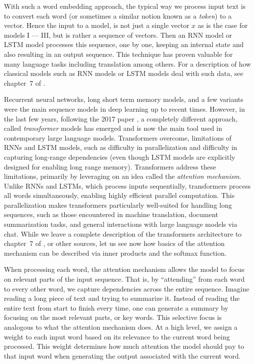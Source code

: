 \documentclass[12pt]{article}
\begin{document}
With such a word embedding approach, the typical way we process input text is to convert each word (or sometimes a similar notion known as a {\em token}) to a vector. Hence the input to a model, is not just a single vector $x$ as is the case for models I --- III, but is rather a sequence of vectors. Then an RNN model or LSTM model processes this sequence, one by one, keeping an internal state and also resulting in an output sequence. This technique has proven valuable for many language tasks including translation among others. For a description of how classical models such as RNN models or LSTM models deal with such data,  see chapter~7 of \cite{LiquetMokaNazarathy2024DeepLearning}.

Recurrent neural networks, long short term memory models, and a few variants were the main sequence models in deep learning up to recent times. However, in the last few years, following the 2017 paper \cite{vaswani2017attention}, a completely different approach, called {\em transformer} models has emerged and is now the main tool used in contemporary large language models. Transformers overcome, limitations of RNNs and LSTM models, such as difficulty in parallelization and difficulty in capturing long-range dependencies (even though LSTM models are explicitly designed for enabling long range memory). Transformers address these limitations, primarily by leveraging on an idea called the {\em attention mechanism}. Unlike RNNs and LSTMs, which process inputs sequentially, transformers process all words simultaneously, enabling highly efficient parallel computation. This parallelization makes transformers particularly well-suited for handling long sequences, such as those encountered in machine translation, document summarization tasks, and general interactions with large language models via chat. While we leave a complete description of the transformers architecture to  chapter~7 of \cite{LiquetMokaNazarathy2024DeepLearning}, or other sources, let us see now how basics of the attention mechanism can be described via inner products and the softmax function.

When processing each word, the attention mechanism allows the model to focus on relevant parts of the input sequence. That is, by ``attending'' from each word to every other word, we capture dependencies across the entire sequence. Imagine reading a long piece of text and trying to summarize it. Instead of reading the entire text from start to finish every time, one can generate a summary by focusing on the most relevant parts, or key words. This selective focus is analogous to what the attention mechanism does. At a high level, we assign a weight to each input word based on its relevance to the current word being processed. This weight determines how much attention the model should pay to that input word when generating the output associated with the current word. 
\end{document}
